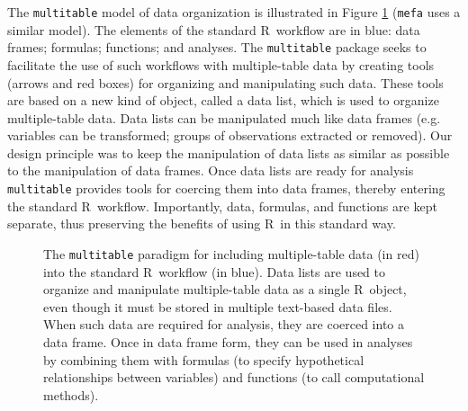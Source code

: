 \documentclass{article}
\newcommand{\R}{{\sf R}}
\newcommand{\code}[1]{\texttt{#1}}
\numberwithin{exercise}{section}
\begin{document}
The \code{multitable} model of data organization is illustrated in Figure \ref{fig:model} (\code{mefa} uses a similar model).  The elements of the standard \R\ workflow are in blue: data frames; formulas; functions; and analyses.  The \code{multitable} package seeks to facilitate the use of such workflows with multiple-table data by creating tools (arrows and red boxes) for organizing and manipulating such data.  These tools are based on a new kind of object, called a data list, which is used to organize multiple-table data.  Data lists can be manipulated much like data frames (e.g. variables can be transformed; groups of observations extracted or removed).  Our design principle was to keep the manipulation of data lists as similar as possible to the manipulation of data frames.  Once data lists are ready for analysis \code{multitable} provides tools for coercing them into data frames, thereby entering the standard \R\ workflow.  Importantly, data, formulas, and functions are kept separate, thus preserving the benefits of using \R\ in this standard way.

\begin{figure}
\caption{The \code{multitable} paradigm for including multiple-table data (in red) into the standard \R\ workflow (in blue).  Data lists are used to organize and manipulate multiple-table data as a single \R\ object, even though it must be stored in multiple text-based data files.  When such data are required for analysis, they are coerced into a data frame.  Once in data frame form, they can be used in analyses by combining them with formulas (to specify hypothetical relationships between variables) and functions (to call computational methods).} 
\label{fig:model}
\end{figure}
\end{document}
